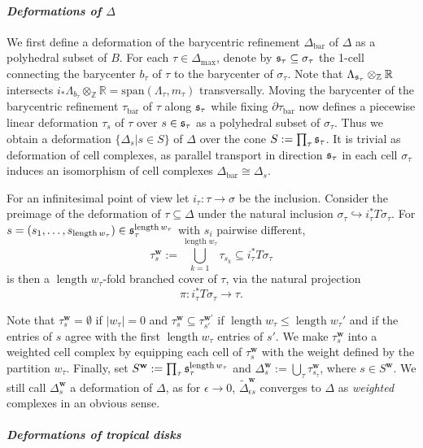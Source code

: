 \documentclass[11pt,letter]{amsart}
\theoremstyle{definition}
\theoremstyle{remark}
\numberwithin{equation}{section}
\numberwithin{figure}{section}
\newcommand{\bary}{\mathrm{bar}}
\newcommand{\length}{\operatorname{length}}
\newcommand{\cover}{\tau^{\mathbf w}_s}
\newcommand{\Cover}{\Delta^{\mathbf w}_{s} }
\newcommand{\ray}{\frak s}
\newcommand{\defbase}{S^{\mathbf w}}
\newcommand{\ZZ} {\mathbb{Z}}
\newcommand{\RR} {\mathbb{R}}
\renewcommand {\max} {{\operatorname{max}}}
\begin{document}
\paragraph{\emph{Deformations of $\Delta$}}
We first define a deformation of the barycentric refinement $\Delta_\bary$ of
$\Delta$ as a polyhedral subset of $B$. For each $\tau \in \Delta_\max$, denote
by $\ray_\tau \subseteq \sigma_\tau$ the 1-cell connecting the barycenter
$b_\tau$ of $\tau$ to the barycenter of $\sigma_\tau$. Note that
$\Lambda_{\ray_\tau} \otimes_\ZZ \RR$ intersects $i_*\Lambda_{b_\tau}
\otimes_\ZZ \RR= \mathrm{span}(\Lambda_\tau,m_\tau)$ transversally. Moving the
barycenter of the barycentric refinement $\tau_\bary$ of $\tau$ along
$\ray_\tau$ while fixing $\partial \tau_\bary$ now defines a piecewise linear
deformation $\tau_s$ of $\tau$ over $s\in \ray_\tau$ as a polyhedral subset of
$\sigma_\tau$. Thus we obtain a deformation $\{ \Delta_s |s \in S\}$ of $
\Delta$ over the cone $S:=\prod_\tau \ray_\tau$. It is trivial as deformation of
cell complexes, as parallel transport in direction $\ray_\tau$ in each cell
$\sigma_\tau$ induces an isomorphism of cell complexes $\Delta_\bary \cong
\Delta_s$.

For an infinitesimal point of view let $i_\tau:\tau\to\sigma$ be the inclusion.
Consider the preimage of the deformation of $\tau\subseteq\Delta$ under the
natural inclusion $\sigma_\tau \hookrightarrow i_\tau^*T\sigma_\tau$. For
$s=(s_1,\ldots, s_{\length w_\tau})\in \ray_\tau^{\length w_\tau}$ with $s_i$
pairwise different,
\[
\cover:= \bigcup_{k=1}^{\length w_\tau}
\tau_{s_k} \subseteq i_\tau^*T\sigma_\tau
\]
is then a $\length w_\tau$-fold branched cover of $\tau$, via the natural
projection
\[
\pi: i_\tau^*T\sigma_\tau \to \tau.
\]

Note that $\cover = \emptyset$ if $|w_\tau|=0$ and $\cover \subseteq
\tau_{s'}^{\mathbf w'}$ if $\length w_\tau \leq \length w_\tau'$ and if the
entries of $s$ agree with the first $\length w_\tau$ entries of $s'$. We
make $\tau_s^{\mathbf w}$ into a weighted cell complex by equipping each cell of
$\cover$ with the weight defined by the partition $w_\tau$. Finally, set
$\defbase:= \prod_\tau \ray_\tau^{\length w_\tau}$ and $\Cover:= \bigcup_\tau
\tau^{\mathbf w}_{s_\tau}$, where $s \in \defbase$. We still call $\Cover$ a
deformation of $\Delta$, as for $\epsilon \to 0$, $\tilde \Delta_{\epsilon
s}^{\mathbf w}$ converges to $\Delta$ as \emph{weighted} complexes in an obvious
sense.
\medskip
 
\paragraph{\emph{Deformations of tropical disks}} 
 
\end{document}
